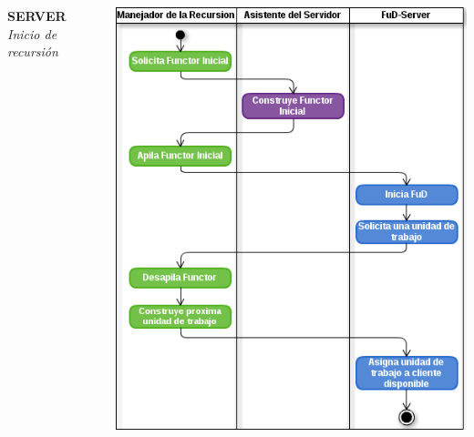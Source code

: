 \begin{frame}
    \begin{columns}[T]
        \begin{column}{.3\textwidth}
            \begin{center}
                \textbf{SERVER}\\
                \textit{Inicio de recursión}
            \end{center}
        \end{column}
        \begin{column}{.7\textwidth}
            \centering
            \includegraphics[scale=0.39]{images/ActivityRecAbs-1.png}
        \end{column}
    \end{columns}
\end{frame}

